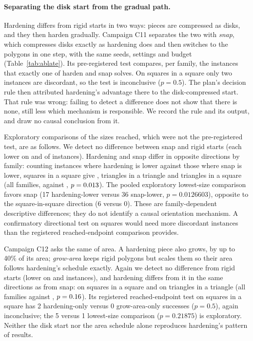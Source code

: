 
\paragraph{Separating the disk start from the gradual path.} Hardening differs from rigid starts in two ways: pieces are compressed as disks, and they then harden gradually. Campaign C11 separates the two with \emph{snap}, which compresses disks exactly as hardening does and then switches to the polygons in one step, with the same seeds, settings and budget (Table~\ref{tab:ablate}). Its pre-registered test compares, per family, the instances that exactly one of harden and snap solves. On squares in a square only two instances are discordant, so the test is inconclusive ($p=0.5$). The plan's decision rule then attributed hardening's advantage there to the disk-compressed start. That rule was wrong: failing to detect a difference does not show that there is none, still less which mechanism is responsible. We record the rule and its output, and draw no causal conclusion from it.

Exploratory comparisons of the sizes reached, which were not the pre-registered test, are as follows. We detect no difference between snap and rigid starts (each lower on \SnapRXLower{} and \SnapRRLower{} of \CsevenInstances{} instances). Hardening and snap differ in opposite directions by family: counting instances where hardening is lower against those where snap is lower, squares in a square give \SnapSquSqu{}, triangles in a triangle \SnapTriTri{} and triangles in a square \SnapTriSqu{} (all families, \SnapHLower{} against \SnapXLower, $p=0.013$). The pooled exploratory lowest-size comparison favors snap (17 hardening-lower versus 36 snap-lower, $p=0.0126603$), opposite to the square-in-square direction (6 versus 0). These are family-dependent descriptive differences; they do not identify a causal orientation mechanism. A confirmatory directional test on squares would need more discordant instances than the registered reached-endpoint comparison provides.

Campaign C12 asks the same of area. A hardening piece also grows, by up to 40\% of its area; \emph{grow-area} keeps rigid polygons but scales them so their area follows hardening's schedule exactly. Again we detect no difference from rigid starts (lower on \AreaRXLower{} and \AreaRRLower{} instances), and hardening differs from it in the same directions as from snap: \AreaSquSqu{} on squares in a square and \AreaTriTri{} on triangles in a triangle (all families \AreaHLower{} against \AreaXLower, $p=0.16$). Its registered reached-endpoint test on squares in a square has 2 hardening-only versus 0 grow-area-only successes ($p=0.5$), again inconclusive; the 5 versus 1 lowest-size comparison ($p=0.21875$) is exploratory. Neither the disk start nor the area schedule alone reproduces hardening's pattern of results.

